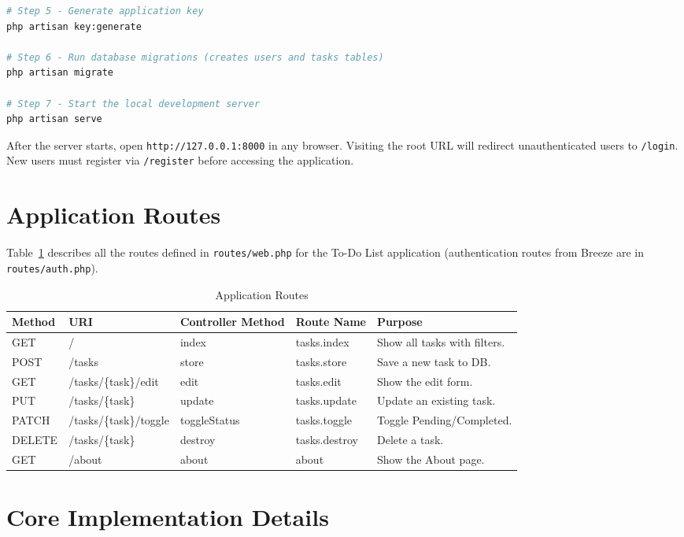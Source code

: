 \documentclass[12pt,a4paper]{report}
\begin{document}
\begin{titlepage}
\begin{lstlisting}[language=bash, caption={Project Setup Commands}]
# Step 5 - Generate application key
php artisan key:generate

# Step 6 - Run database migrations (creates users and tasks tables)
php artisan migrate

# Step 7 - Start the local development server
php artisan serve
\end{lstlisting}

After the server starts, open \texttt{http://127.0.0.1:8000} in any browser.
Visiting the root URL will redirect unauthenticated users to \texttt{/login}.
New users must register via \texttt{/register} before accessing the application.

\section{Application Routes}

Table~\ref{tab:routes} describes all the routes defined in \texttt{routes/web.php}
for the To-Do List application (authentication routes from Breeze are in
\texttt{routes/auth.php}).

\begin{table}[h!]
\centering
\caption{Application Routes}
\label{tab:routes}
\renewcommand{\arraystretch}{1.3}
\begin{tabularx}{\textwidth}{@{}llllX@{}}
\toprule
\textbf{Method} & \textbf{URI} & \textbf{Controller Method} & \textbf{Route Name} & \textbf{Purpose} \\
\midrule
GET    & /                      & index        & tasks.index   & Show all tasks with filters. \\
POST   & /tasks                 & store        & tasks.store   & Save a new task to DB. \\
GET    & /tasks/\{task\}/edit   & edit         & tasks.edit    & Show the edit form. \\
PUT    & /tasks/\{task\}        & update       & tasks.update  & Update an existing task. \\
PATCH  & /tasks/\{task\}/toggle & toggleStatus & tasks.toggle  & Toggle Pending/Completed. \\
DELETE & /tasks/\{task\}        & destroy      & tasks.destroy & Delete a task. \\
GET    & /about                 & about        & about         & Show the About page. \\
\bottomrule
\end{tabularx}
\end{table}

\section{Core Implementation Details}


\end{titlepage}
\end{document}
